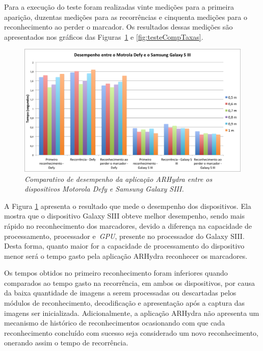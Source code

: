 	Para a execução do teste foram realizadas vinte medições para a primeira aparição, duzentas medições para as recorrências 
	e cinquenta medições para o reconhecimento ao perder o marcador. Os resultados dessas medições são apresentados nos 
	gráficos das Figuras~\ref{fig:testeCompDesempenho} e \ref{fig:testeCompTaxas}.
	
	\begin{figure}[htb] 
		\centering \includegraphics[scale=0.55]{figuras/cap4/grafico_desempenho.png}
		\caption{\textit{Comparativo de desempenho da aplicação ARHydra entre os dispositivos Motorola Defy e 
							Samsung Galaxy SIII.}}
		\label{fig:testeCompDesempenho} 
	\end{figure}
	
	
	A Figura \ref{fig:testeCompDesempenho} apresenta o resultado que mede o desempenho dos dispositivos. Ela mostra que o 
	dispositivo Galaxy SIII obteve melhor desempenho, sendo mais rápido no reconhecimento dos marcadores, devido a diferença 
	na capacidade de processamento, processador e~\textit{GPU}, presente no processador do Galaxy SIII. Desta forma, 
	quanto maior for a capacidade de processamento do dispositivo menor será o tempo gasto pela aplicação ARHydra reconhecer
	os marcadores.   
	
	Os tempos obtidos no primeiro reconhecimento foram inferiores quando comparados ao tempo gasto na recorrência, em ambos 
	os dispositivos, por causa da baixa quantidade de imagens a serem processadas ou descartadas pelos módulos de 
	reconhecimento,	decodificação e apresentação após a captura das imagens ser inicializada. Adicionalmente, a 
	aplicação ARHydra não apresenta um mecanismo de histórico de reconhecimentos ocasionando com que cada 
	reconhecimento concluído com sucesso seja considerado um novo reconhecimento, onerando assim o tempo de recorrência. 
	
